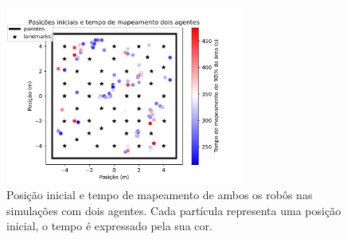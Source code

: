 \begin{figure}
  \centering
  \includegraphics[width=0.7\textwidth]{figs/two-agents/initial_positions_and_time_two_agents.pdf}
  \caption[Posição inicial e tempo de mapeamento das simulações com dois agentes.]{Posição inicial e tempo de mapeamento de ambos os robôs nas simulações com dois agentes. Cada partícula representa uma posição inicial, o tempo é expressado pela sua cor.}
  \label{fig:two-agent-initial-pos-and-time}
\end{figure}

